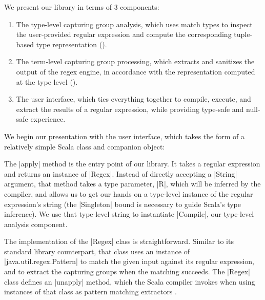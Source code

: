 We present our library in terms of 3 components:

\begin{enumerate}
  \item The type-level capturing group analysis, which uses match types to inspect the user-provided regular expression and compute the corresponding tuple-based type representation ().

  \item The term-level capturing group processing, which extracts and sanitizes the output of the regex engine, in accordance with the representation computed at the type level ().

  \item The user interface, which ties everything together to compile, execute, and extract the results of a regular expression, while providing type-safe and null-safe experience.
\end{enumerate}

We begin our presentation with the user interface, which takes the form of a relatively simple Scala class and companion object:

\regexUserLevel
%

The |apply| method is the entry point of our library.
It takes a regular expression and returns an instance of |Regex|.
Instead of directly accepting a |String| argument, that method takes a type parameter, |R|, which will be inferred by the compiler, and allows us to get our hands on a type-level instance of the regular expression's string (the |Singleton| bound is necessary to guide Scala's type inference).
We use that type-level string to instantiate |Compile|, our type-level analysis component.

The implementation of the |Regex| class is straightforward.
Similar to its standard library counterpart, that class uses an instance of |java.util.regex.Pattern| to match the given input against its regular expression, and to extract the capturing groups when the matching succeeds.
The |Regex| class defines an |unapply| method, which the Scala compiler invokes when using instances of that class as pattern matching extractors \citep{emir2007matching}.

